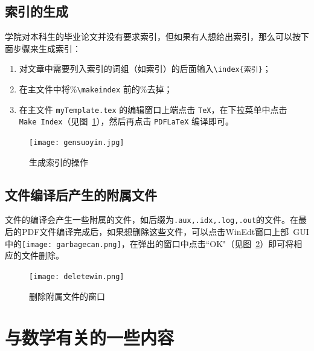 \subsection{索引的生成}
学院对本科生的毕业论文并没有要求索引，但如果有人想给出索引，那么可以按下面步骤来生成索引：
\begin{enumerate}
  \item 对文章中需要列入索引的词组（如索引）的后面输入\verb=\index{索引}=；
  \item 在主文件中将\%\verb=\makeindex= 前的\%去掉；
  \item 在主文件{ \tt myTemplate.tex} 的编辑窗口上端点击{ \tt TeX}，在下拉菜单中点击{\tt Make~Index}（见图~\ref{fig:gensuoyin}），然后再点击{ \tt PDFLaTeX} 编译即可。
\end{enumerate}
\begin{figure}
  \centering
  \texttt{[image: gensuoyin.jpg]}\\
  \caption{生成索引的操作}\label{fig:gensuoyin}
\end{figure}

\subsection{\CTeX{} 文件编译后产生的附属文件}
\CTeX{} 文件的编译会产生一些附属的文件，如后缀为{\tt .aux,.idx,.log,.out}的文件。在最后的PDF文件编译完成后，如果想删除这些文件，可以点击{\rm WinEdt}窗口上部~GUI 中的\texttt{[image: garbagecan.png]}，在弹出的窗口中点击``OK"（见图~\ref{fig:deletewin}）即可将相应的文件删除。
\begin{figure}
  \centering
  \texttt{[image: deletewin.png]}\\
  \caption{删除附属文件的窗口}\label{fig:deletewin}
\end{figure}

\section{与数学有关的一些内容}\label{sec:2two}
